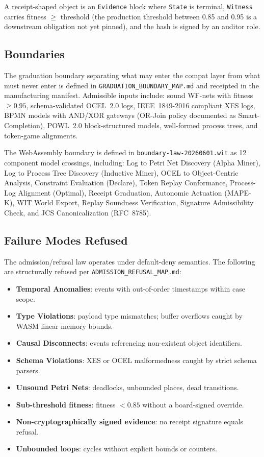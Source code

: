 A receipt-shaped object is an \texttt{Evidence} block where \texttt{State} is terminal,
\texttt{Witness} carries fitness $\geq$ threshold (the production threshold between 0.85
and 0.95 is a downstream obligation not yet pinned), and the hash is signed by an auditor
role.

\subsection{Boundaries}
\label{sec:sources-wasm4pm-compat-architecture-boundaries}

The graduation boundary separating what may enter the compat layer from what must never
enter is defined in \texttt{GRADUATION\_BOUNDARY\_MAP.md} and receipted in the
manufacturing manifest. Admissible inputs include: sound WF-nets with fitness $\geq 0.95$,
schema-validated OCEL~2.0 logs, IEEE~1849-2016 compliant XES logs, BPMN models with
AND/XOR gateways (OR-Join policy documented as Smart-Completion), POWL~2.0 block-structured
models, well-formed process trees, and token-game alignments.

The WebAssembly boundary is defined in \texttt{boundary-law-20260601.wit} as 12 component
model crossings, including: Log to Petri Net Discovery (Alpha Miner), Log to Process Tree
Discovery (Inductive Miner), OCEL to Object-Centric Analysis, Constraint Evaluation
(Declare), Token Replay Conformance, Process-Log Alignment (Optimal), Receipt Graduation,
Autonomic Actuation (MAPE-K), WIT World Export, Replay Soundness Verification, Signature
Admissibility Check, and JCS Canonicalization (RFC~8785).

\subsection{Failure Modes Refused}
\label{sec:sources-wasm4pm-compat-architecture-failures}

The admission/refusal law operates under default-deny semantics. The following are
structurally refused per \texttt{ADMISSION\_REFUSAL\_MAP.md}:

\begin{itemize}
  \item \textbf{Temporal Anomalies}: events with out-of-order timestamps within case scope.
  \item \textbf{Type Violations}: payload type mismatches; buffer overflows caught by WASM
    linear memory bounds.
  \item \textbf{Causal Disconnects}: events referencing non-existent object identifiers.
  \item \textbf{Schema Violations}: XES or OCEL malformedness caught by strict schema parsers.
  \item \textbf{Unsound Petri Nets}: deadlocks, unbounded places, dead transitions.
  \item \textbf{Sub-threshold fitness}: fitness $< 0.85$ without a board-signed override.
  \item \textbf{Non-cryptographically signed evidence}: no receipt signature equals refusal.
  \item \textbf{Unbounded loops}: cycles without explicit bounds or counters.
\end{itemize}

